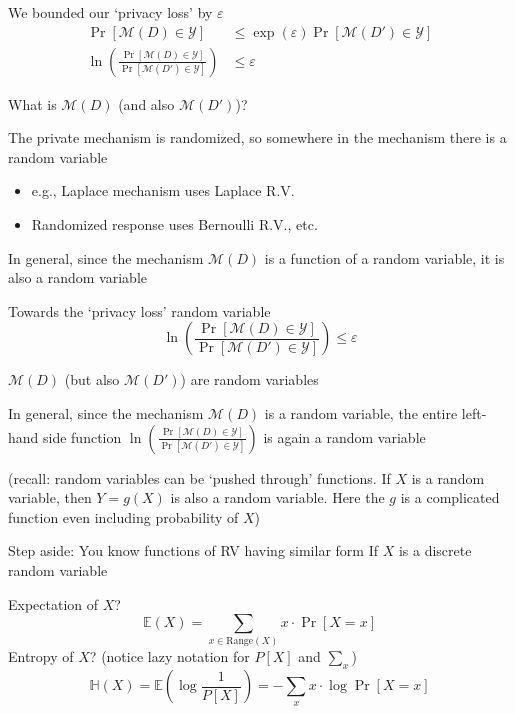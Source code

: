 \documentclass[12pt,aspectratio=169,handout]{beamer}
\begin{document}
\begin{frame}{We bounded our `privacy loss' by $\varepsilon$}
\vspace{-1em}
$$
\begin{aligned}
\Pr[\mathcal{M}(D) \in \mathcal{Y}] &\leq \exp(\varepsilon) \Pr[\mathcal{M}(D') \in \mathcal{Y}] \\
\ln \left( \frac{
\Pr[\mathcal{M}(D) \in \mathcal{Y}]
}{
\Pr[\mathcal{M}(D') \in \mathcal{Y}]
}
\right)
&\leq \varepsilon
\end{aligned}
$$

What is $\mathcal{M}(D)$ (and also $\mathcal{M}(D')$)?

\pause

The private mechanism is randomized, so somewhere in the mechanism there is a random variable
\begin{itemize}
\item e.g., Laplace mechanism uses Laplace R.V.
\item Randomized response uses Bernoulli R.V., etc.
\end{itemize}
In general, since the mechanism $\mathcal{M}(D)$ is a function of a random variable, it is also a random variable

\end{frame}


\begin{frame}{Towards the `privacy loss' random variable}
$$
\ln \left( \frac{
\Pr[\mathcal{M}(D) \in \mathcal{Y}]
}{
\Pr[\mathcal{M}(D') \in \mathcal{Y}]
}
\right)
\leq \varepsilon
$$

$\mathcal{M}(D)$ (but also $\mathcal{M}(D')$) are random variables

\pause

In general, since the mechanism $\mathcal{M}(D)$ is a random variable, the entire left-hand side function
$
\ln \left( \frac{
\Pr[\mathcal{M}(D) \in \mathcal{Y}]
}{
\Pr[\mathcal{M}(D') \in \mathcal{Y}]
}
\right)
$
is again a random variable

(recall: random variables can be `pushed through' functions. If $X$ is a random variable, then $Y = g(X)$ is also a random variable. Here the $g$ is a complicated function even including probability of $X$)

\end{frame}




\begin{frame}{Step aside: You know functions of RV having similar form}
If $X$ is a discrete random variable

Expectation of $X$? \pause
$$
\mathbb{E}(X) = \sum_{x \in \text{Range}(X)} x \cdot \Pr[X = x]
$$
Entropy of $X$? (notice lazy notation for $P[X]$ and $\sum_x$)
$$
\mathbb{H}(X) = \mathbb{E}\left(\log \frac{1}{P[X]}\right) = 
- \sum_{x} x \cdot \log \Pr[X = x]
$$
\end{frame}
\end{document}
